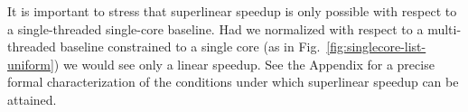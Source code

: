 It is important to stress that superlinear speedup is only possible with respect to a single-threaded single-core baseline. Had we normalized with respect to a multi-threaded baseline constrained to a single core (as in Fig.~\ref{fig:singlecore-list-uniform}) we would see only a linear speedup. See the Appendix for a precise formal characterization of the conditions under which superlinear speedup can be attained.


%





